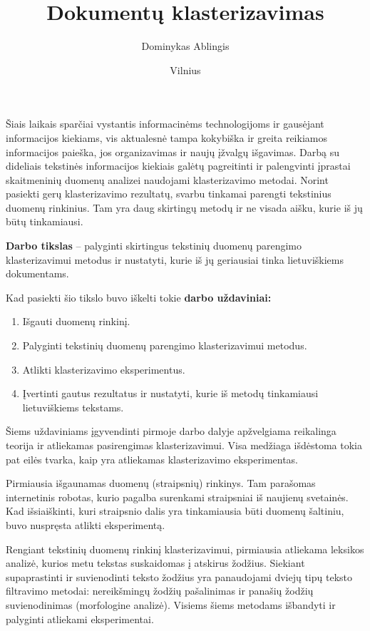 \documentclass{VUMIFInfBakalaurinis}
\title{Dokumentų klasterizavimas}
\author{Dominykas Ablingis}
\date{Vilnius \\ \the\year}
\providecommand{\tightlist}{%
	  \setlength{\itemsep}{0pt}\setlength{\parskip}{0pt}}
\begin{document}
\maketitle
\tableofcontents


Šiais laikais sparčiai vystantis informacinėms technologijoms ir
gausėjant informacijos kiekiams, vis aktualesnė tampa kokybiška ir
greita reikiamos informacijos paieška, jos organizavimas ir naujų
įžvalgų išgavimas. Darbą su dideliais tekstinės informacijos kiekiais
galėtų pagreitinti ir palengvinti įprastai skaitmeninių duomenų analizei
naudojami klasterizavimo metodai. Norint pasiekti gerų klasterizavimo
rezultatų, svarbu tinkamai parengti tekstinius duomenų rinkinius. Tam
yra daug skirtingų metodų ir ne visada aišku, kurie iš jų būtų
tinkamiausi.

\textbf{Darbo tikslas} -- palyginti skirtingus tekstinių duomenų
parengimo klasterizavimui metodus ir nustatyti, kurie iš jų geriausiai
tinka lietuviškiems dokumentams.

Kad pasiekti šio tikslo buvo iškelti tokie \textbf{darbo uždaviniai:}

\begin{enumerate}
\def\labelenumi{\arabic{enumi}.}
\tightlist
\item
  Išgauti duomenų rinkinį.
\item
  Palyginti tekstinių duomenų parengimo klasterizavimui metodus.
\item
  Atlikti klasterizavimo eksperimentus.
\item
  Įvertinti gautus rezultatus ir nustatyti, kurie iš metodų tinkamiausi
  lietuviškiems tekstams.
\end{enumerate}

Šiems uždaviniams įgyvendinti pirmoje darbo dalyje apžvelgiama
reikalinga teorija ir atliekamas pasirengimas klasterizavimui. Visa
medžiaga išdėstoma tokia pat eilės tvarka, kaip yra atliekamas
klasterizavimo eksperimentas.

Pirmiausia išgaunamas duomenų (straipsnių) rinkinys. Tam parašomas
  internetinis robotas, kurio pagalba surenkami straipsniai iš naujienų
  svetainės. Kad išsiaiškinti, kuri straipsnio dalis yra tinkamiausia
  būti duomenų šaltiniu, buvo nuspręsta atlikti eksperimentą.

Rengiant tekstinių duomenų rinkinį klasterizavimui, pirmiausia
  atliekama leksikos analizė, kurios metu tekstas suskaidomas į atskirus
  žodžius. Siekiant supaprastinti ir suvienodinti teksto žodžius yra
  panaudojami dviejų tipų teksto filtravimo metodai: nereikšmingų žodžių
  pašalinimas ir panašių žodžių suvienodinimas (morfologine analizė).
  Visiems šiems metodams išbandyti ir palyginti atliekami eksperimentai.
\end{document}

